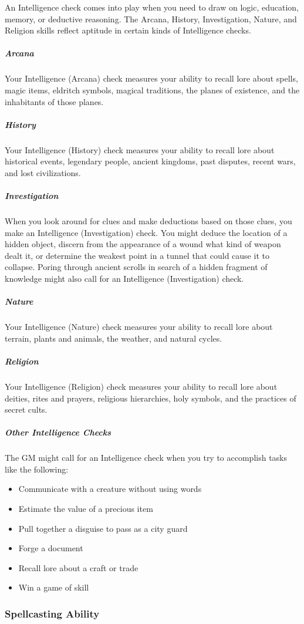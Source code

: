 An Intelligence check comes into play when you need to draw on logic, education, memory, or deductive reasoning. The Arcana, History, Investigation, Nature, and Religion skills reflect aptitude in certain kinds of Intelligence checks.

\subparagraph*{Arcana} Your Intelligence (Arcana) check measures your ability to recall lore about spells, magic items, eldritch symbols, magical traditions, the planes of existence, and the inhabitants of those planes.

\subparagraph*{History} Your Intelligence (History) check measures your ability to recall lore about historical events, legendary people, ancient kingdoms, past disputes, recent wars, and lost civilizations.

\subparagraph*{Investigation} When you look around for clues and make deductions based on those clues, you make an Intelligence (Investigation) check. You might deduce the location of a hidden object, discern from the appearance of a wound what kind of weapon dealt it, or determine the weakest point in a tunnel that could cause it to collapse. Poring through ancient scrolls in search of a hidden fragment of knowledge might also call for an Intelligence (Investigation) check.

\subparagraph*{Nature} Your Intelligence (Nature) check measures your ability to recall lore about terrain, plants and animals, the weather, and natural cycles.

\subparagraph*{Religion} Your Intelligence (Religion) check measures your ability to recall lore about deities, rites and prayers, religious hierarchies, holy symbols, and the practices of secret cults.

\subparagraph*{Other Intelligence Checks} The GM might call for an Intelligence check when you try to accomplish tasks like the following:

\begin{itemize}
\item Communicate with a creature without using words
\item Estimate the value of a precious item
\item Pull together a disguise to pass as a city guard
\item Forge a document
\item Recall lore about a craft or trade
\item Win a game of skill
\end{itemize}

\subsubsection{Spellcasting Ability}

